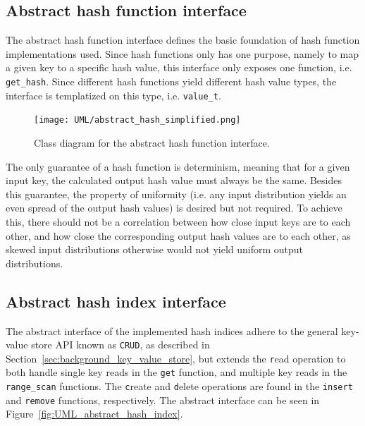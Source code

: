 \documentclass[11pt]{report} %
\begin{document}
\subsection{Abstract hash function interface}
\label{subsec:design_abstract_hash_function}
The abstract hash function interface defines the basic foundation of hash function implementations used. Since hash functions only has one purpose, namely to map a given key to a specific hash value, this interface only exposes one function, i.e. \verb|get_hash|. Since different hash functions yield different hash value types, the interface is templatized on this type, i.e. \verb|value_t|.
\begin{figure}[H]
  \centering
  \texttt{[image: UML/abstract\_hash\_simplified.png]}\\
  \caption{Class diagram for the abstract hash function interface.}\label{fig:UML_abstract_hash_function}
\end{figure}
\noindent
The only guarantee of a hash function is determinism, meaning that for a given input key, the calculated output hash value must always be the same. Besides this guarantee, the property of uniformity (i.e. any input distribution yields an even spread of the output hash values) is desired but not required. To achieve this, there should not be a correlation between how close input keys are to each other, and how close the corresponding output hash values are to each other, as skewed input distributions otherwise would not yield uniform output distributions.
\subsection{Abstract hash index interface}
\label{subsec:design_abstract_hash_index}
The abstract interface of the implemented hash indices adhere to the general key-value store API known as \verb|CRUD|, as described in Section~\ref{sec:background_key_value_store}, but extends the \verb|r|ead operation to both handle single key reads in the \verb|get| function, and multiple key reads in the \verb|range_scan| functions. The \verb|c|reate and \verb|d|elete operations are found in the \verb|insert| and \verb|remove| functions, respectively. The abstract interface can be seen in Figure~\ref{fig:UML_abstract_hash_index}.
\end{document}
